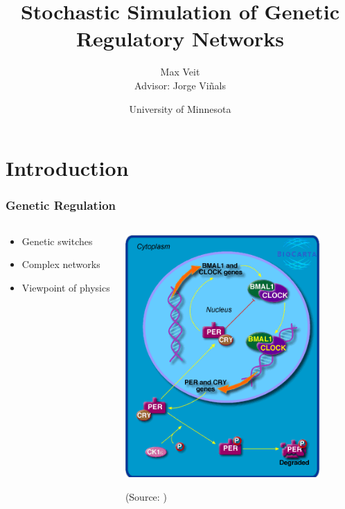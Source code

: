 \documentclass[xcolor={usenames,dvipsnames,svgnames}]{beamer}
\begin{document}
\title[Genetic Networks]{Stochastic Simulation of Genetic Regulatory Networks}
\author[Max Veit]{Max Veit\\Advisor: Jorge Viñals}
\date[2014-05-07{7 May 2014}
\institute[U of MN]{University of Minnesota}
\subject{Physics}

\frame{\titlepage}

\section{Introduction} %
\label{sec:introduction}
\begin{frame}
    \frametitle{Genetic Regulation}
    \begin{columns}[t]
        \begin{column}{0.5\textwidth}
            \begin{itemize}
                \item Genetic switches
                \item Complex networks
                \item Viewpoint of physics
            \end{itemize}
        \end{column}
        \begin{column}[T]{0.5\textwidth}
            \includegraphics[width=0.85\textwidth]{h_circadianPathway.png}

            \small (Source: \cite{biocarta})
        \end{column}
    \end{columns}
\end{frame}
\end{document}
